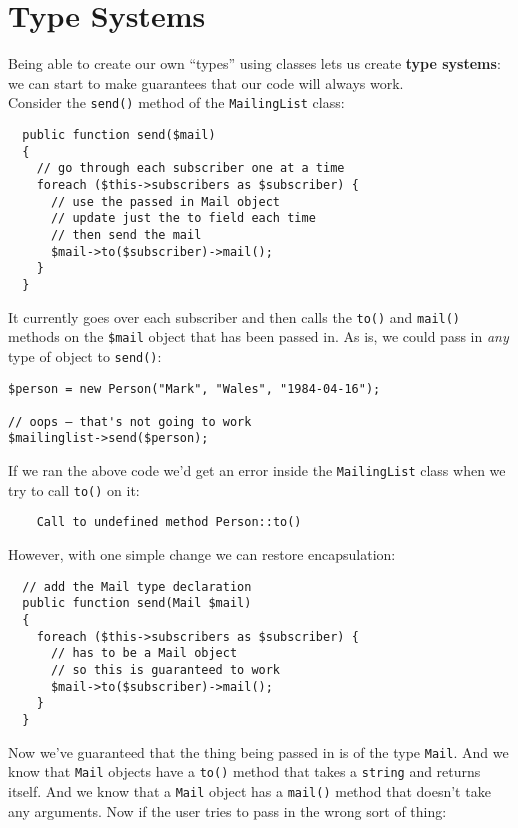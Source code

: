 \section{Type Systems}

Being able to create our own ``types'' using classes lets us create \textbf{type systems}: we can start to make guarantees that our code will always work.
\\

Consider the \texttt{send()} method of the \texttt{MailingList} class:

\begin{verbatim}
  public function send($mail)
  {
    // go through each subscriber one at a time
    foreach ($this->subscribers as $subscriber) {
      // use the passed in Mail object
      // update just the to field each time
      // then send the mail
      $mail->to($subscriber)->mail();
    }
  }
\end{verbatim}

It currently goes over each subscriber and then calls the \texttt{to()} and \texttt{mail()} methods on the \texttt{\$mail} object that has been passed in. As is, we could pass in \textit{any} type of object to \texttt{send()}:

\begin{verbatim}
$person = new Person("Mark", "Wales", "1984-04-16");

// oops – that's not going to work
$mailinglist->send($person);
\end{verbatim}

If we ran the above code we'd get an error inside the \texttt{MailingList} class when we try to call \texttt{to()} on it:

\begin{verbatim}
    Call to undefined method Person::to()
\end{verbatim}

However, with one simple change we can restore encapsulation:

\begin{verbatim}
  // add the Mail type declaration
  public function send(Mail $mail)
  {
    foreach ($this->subscribers as $subscriber) {
      // has to be a Mail object
      // so this is guaranteed to work
      $mail->to($subscriber)->mail();
    }
  }
\end{verbatim}

Now we've guaranteed that the thing being passed in is of the type \texttt{Mail}. And we know that \texttt{Mail} objects have a \texttt{to()} method that takes a \texttt{string} and returns itself. And we know that a \texttt{Mail} object has a \texttt{mail()} method that doesn't take any arguments. Now if the user tries to pass in the wrong sort of thing:

